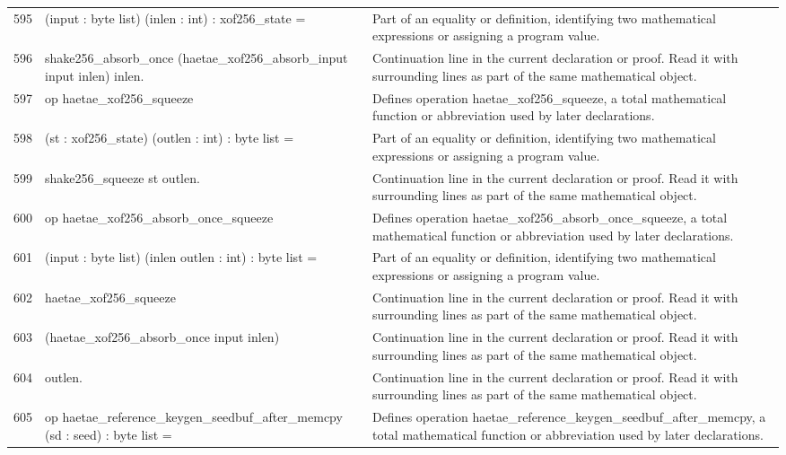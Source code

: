 \documentclass[10pt]{article}
\begin{document}
\begin{longtable}{r L{0.53\textwidth} L{0.37\textwidth}}
595 & {\ttfamily\scriptsize    (input : byte list) (inlen : int) : xof256\_state =} & Part of an equality or definition, identifying two mathematical expressions or assigning a program value. \\
596 & {\ttfamily\scriptsize   shake256\_absorb\_once (haetae\_xof256\_absorb\_input input inlen) inlen.} & Continuation line in the current declaration or proof.  Read it with surrounding lines as part of the same mathematical object. \\
597 & {\ttfamily\scriptsize op haetae\_xof256\_squeeze} & Defines operation haetae\_xof256\_squeeze, a total mathematical function or abbreviation used by later declarations. \\
598 & {\ttfamily\scriptsize    (st : xof256\_state) (outlen : int) : byte list =} & Part of an equality or definition, identifying two mathematical expressions or assigning a program value. \\
599 & {\ttfamily\scriptsize   shake256\_squeeze st outlen.} & Continuation line in the current declaration or proof.  Read it with surrounding lines as part of the same mathematical object. \\
600 & {\ttfamily\scriptsize op haetae\_xof256\_absorb\_once\_squeeze} & Defines operation haetae\_xof256\_absorb\_once\_squeeze, a total mathematical function or abbreviation used by later declarations. \\
601 & {\ttfamily\scriptsize    (input : byte list) (inlen outlen : int) : byte list =} & Part of an equality or definition, identifying two mathematical expressions or assigning a program value. \\
602 & {\ttfamily\scriptsize   haetae\_xof256\_squeeze} & Continuation line in the current declaration or proof.  Read it with surrounding lines as part of the same mathematical object. \\
603 & {\ttfamily\scriptsize     (haetae\_xof256\_absorb\_once input inlen)} & Continuation line in the current declaration or proof.  Read it with surrounding lines as part of the same mathematical object. \\
604 & {\ttfamily\scriptsize     outlen.} & Continuation line in the current declaration or proof.  Read it with surrounding lines as part of the same mathematical object. \\
605 & {\ttfamily\scriptsize op haetae\_reference\_keygen\_seedbuf\_after\_memcpy (sd : seed) : byte list =} & Defines operation haetae\_reference\_keygen\_seedbuf\_after\_memcpy, a total mathematical function or abbreviation used by later declarations. \\

\end{longtable}
\end{document}
